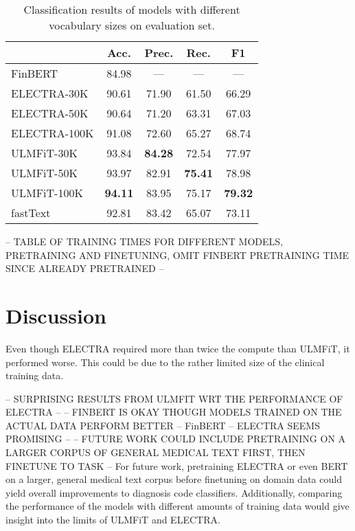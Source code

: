 \begin{table}[t]
\begin{center}
\begin{tabular}{lcccc}
        & Acc. & Prec. & Rec. & F1 \\
        \hline
FinBERT &   84.98  &   ---   &    --- &  ---   \\
ELECTRA-30K    &     90.61 & 71.90 & 61.50 & 66.29 \\
ELECTRA-50K  &     90.64 & 71.20 & 63.31 & 67.03 \\
ELECTRA-100K  &     91.08 & 72.60 & 65.27 & 68.74 \\
ULMFiT-30K  &   93.84 & \textbf{84.28} & 72.54 & 77.97 \\
ULMFiT-50K  &  93.97 & 82.91 & \textbf{75.41} & 78.98 \\
ULMFiT-100K  & \textbf{94.11} & 83.95 & 75.17 & \textbf{79.32} \\
fastText & 92.81 & 83.42 & 65.07 & 73.11 \\
\end{tabular}
\caption{Classification results of models with different vocabulary sizes on evaluation set.}
\label{table:results}
\end{center}
\end{table}

-- TABLE OF TRAINING TIMES FOR DIFFERENT MODELS, PRETRAINING AND FINETUNING, OMIT FINBERT PRETRAINING TIME SINCE ALREADY PRETRAINED --

\section{Discussion}\label{Discussion}
Even though ELECTRA required more than twice the compute than ULMFiT, it performed worse.
This could be due to the rather limited size of the clinical training data.

-- SURPRISING RESULTS FROM ULMFIT WRT THE PERFORMANCE OF ELECTRA --
-- FINBERT IS OKAY THOUGH MODELS TRAINED ON THE ACTUAL DATA PERFORM BETTER --
FinBERT
-- ELECTRA SEEMS PROMISING --
-- FUTURE WORK COULD INCLUDE PRETRAINING ON A LARGER CORPUS OF GENERAL MEDICAL TEXT FIRST, THEN FINETUNE TO TASK --
For future work, pretraining ELECTRA or even BERT on a larger, general medical text corpus before finetuning on domain data could yield overall improvements to diagnosis code classifiers.
Additionally, comparing the performance of the models with different amounts of training data would give insight into the limits of ULMFiT and ELECTRA.
